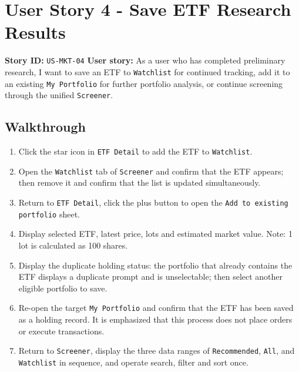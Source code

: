 \section{User Story 4 - Save ETF Research Results}
\textbf{Story ID:} \texttt{US-MKT-04}
\textbf{User story:} As a user who has completed preliminary research, I want to save an ETF to \texttt{Watchlist} for continued tracking, add it to an existing \texttt{My Portfolio} for further portfolio analysis, or continue screening through the unified \texttt{Screener}.
\subsection{Walkthrough}
\begin{enumerate}
\item Click the star icon in \texttt{ETF Detail} to add the ETF to \texttt{Watchlist}.
\item Open the \texttt{Watchlist} tab of \texttt{Screener} and confirm that the ETF appears; then remove it and confirm that the list is updated simultaneously.
\item Return to \texttt{ETF Detail}, click the plus button to open the \texttt{Add to existing portfolio} sheet.
\item Display selected ETF, latest price, lots and estimated market value. Note: 1 lot is calculated as 100 shares.
\item Display the duplicate holding status: the portfolio that already contains the ETF displays a duplicate prompt and is unselectable; then select another eligible portfolio to save.
\item Re-open the target \texttt{My Portfolio} and confirm that the ETF has been saved as a holding record. It is emphasized that this process does not place orders or execute transactions.
\item Return to \texttt{Screener}, display the three data ranges of \texttt{Recommended}, \texttt{All}, and \texttt{Watchlist} in sequence, and operate search, filter and sort once.
\end{enumerate}

